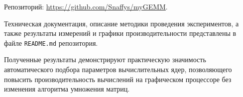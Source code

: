 \documentclass[a4paper]{article}
\begin{document}
Репозиторий: \url{https://github.com/Snaffys/myGEMM}.

Техническая документация, описание методики проведения экспериментов, а также результаты измерений и графики производительности представлены в файле \texttt{README.md} репозитория.

Полученные результаты демонстрируют практическую значимость автоматического подбора параметров вычислительных ядер, позволяющего повысить производительность вычислений на графическом процессоре без изменения алгоритма умножения матриц.
\end{document}
